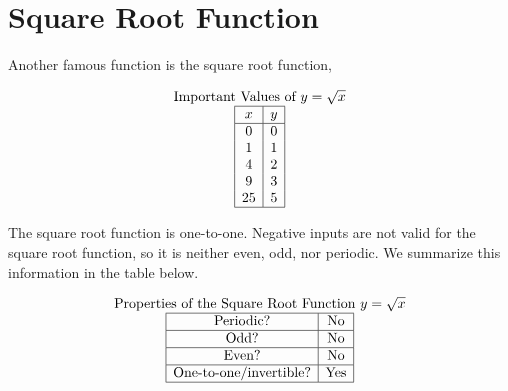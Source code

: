 \documentclass[nooutcomes]{ximera}
\begin{document}
\newpage


\section{Square Root Function}
Another famous function is the square root function,

\begin{center}
\end{center}

\begin{center}
\end{center}


\[
\begin{array}{c }
 \text{\normalfont Important Values of $y=\sqrt{x}$} \\
\begin{array}{|c|c|}
 \hline
 x & y\\
 \hline
 0&0\\
 1&1\\
 4&2\\
 9&3\\
 25&5\\
 \hline
\end{array}
\end{array}
\]

The square root function is one-to-one. Negative inputs are not valid for the square root function, so it is neither even, odd, nor periodic. We summarize this information in the table below.

\[
\begin{array}{c }
 \text{\normalfont Properties of the Square Root Function } y=\sqrt{x} \\
\begin{array}{|c|c|}
 \hline
\text{Periodic?} & \text{No} \\ \hline
\text{Odd?} & \text{No} \\ \hline
\text{Even?} & \text{No} \\ \hline
\text{One-to-one/invertible?} & \text{Yes}\\ \hline
\end{array}
\end{array}
\]
\end{document}
